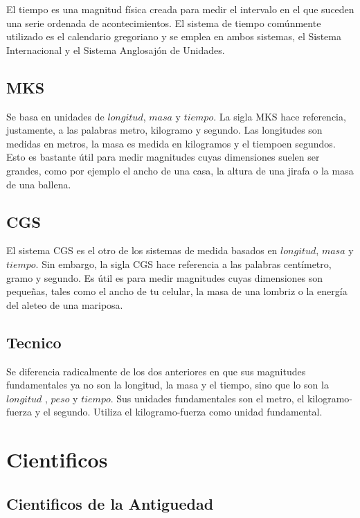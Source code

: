 \documentclass[11pt]{article}
\begin{document}
El tiempo es una magnitud física creada para medir el intervalo en el que suceden una serie ordenada de acontecimientos. El sistema de tiempo comúnmente utilizado es el calendario gregoriano y se emplea en ambos sistemas, el Sistema Internacional y el Sistema Anglosajón de Unidades. 

\subsection{MKS}


Se basa en unidades de $longitud$, $masa$ y $tiempo$. La sigla MKS hace referencia, justamente, a las palabras metro, kilogramo y segundo. Las longitudes son medidas en metros, la masa es medida en kilogramos y el tiempoen segundos. Esto es bastante útil para medir magnitudes cuyas dimensiones suelen ser grandes, como por ejemplo el ancho de una casa, la altura de una jirafa o la masa de una ballena.

\subsection{CGS}

El sistema CGS es el otro de los sistemas de medida basados en $longitud$, $masa$ y $tiempo$. Sin embargo, la sigla CGS hace referencia a las palabras centímetro, gramo y segundo. Es útil es para medir magnitudes cuyas dimensiones son pequeñas, tales como el ancho de tu celular, la masa de una lombriz o la energía del aleteo de una mariposa.

\subsection{Tecnico}

Se diferencia radicalmente de los dos anteriores en que sus magnitudes fundamentales ya no son la longitud, la masa y el tiempo, sino que lo son la $longitud$ , $peso$ y $tiempo$.  Sus unidades fundamentales son el metro, el kilogramo-fuerza y el segundo. Utiliza el kilogramo-fuerza como unidad fundamental.

\section{Cientificos}

\subsection{Cientificos de la Antiguedad} 
\end{document}
